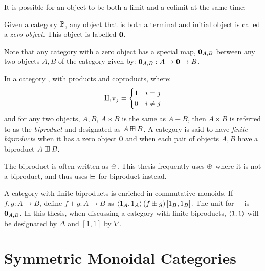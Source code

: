 It is possible for an object to be both a limit and a colimit at the same time:
\begin{definition}\label{def:categorical_zero}
  Given a category $\mathbb{B}$, any object that is both a terminal and initial object is called a
  \emph{zero object}. This object is labelled $\mathbf{0}$.
\end{definition}

Note that any category with a zero object has a special map, $\mathbf{0}_{A,B}$
between any two objects $A,B$ of the category given by: $\mathbf{0}_{A,B} : A \to \mathbf{0} \to B$.

\begin{definition}\label{def:categorical_biproduct}
  In a category \B, with products and coproducts, where:
  \[
    \amalg_{i}\pi_j = \begin{cases}
      1 & i = j\\
      0 & i \neq j
      \end{cases}
  \]
  and for any two objects, $A,B$, $A\times B$ is the same as $A+B$, then $A\times B$ is
  referred to as the \emph{biproduct} and designated as $A\boxplus B$. A category \cD{} is said to
  have \emph{finite biproducts} when it has a zero object $\mathbf{0}$ and when each pair of objects
  $A,B$ have a biproduct $A\boxplus B$.

  The biproduct is often written as $\oplus$. This thesis frequently uses $\oplus$ where it is not a
  biproduct, and thus uses $\boxplus$ for biproduct instead.
\end{definition}

A category with finite biproducts is enriched in commutative monoids. If $f,g:A\to
B$, define $f+g:A\to B$ as $\langle1_{A}, 1_{A}\rangle\, (f\boxplus g)\, [1_{B},1_{B}]$. The unit for
$+$ is $\mathbf{0}_{A,B}$. In this thesis, when discussing a category with finite biproducts,
$\langle1, 1\rangle$ will be designated by $\Delta$ and $[1,1]$ by $\nabla$.



\section{Symmetric Monoidal Categories} %
\label{sub:categories_with_additional_structure}

